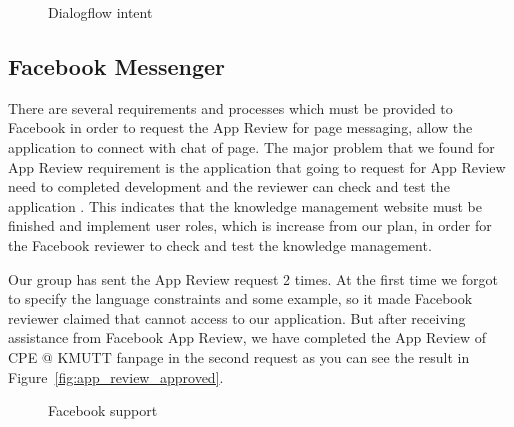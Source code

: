 \documentclass[12pt,oneside,openright,a4paper]{cpe-english-project}
\begin{document}
\begin{figure}[!h]\centering
	\caption{Dialogflow intent}\label{fig:Dialogflow intent}
\end{figure}

\pagebreak
\subsection{Facebook Messenger}
	There are several requirements and processes which must be
	provided to Facebook in order to request the App Review for page messaging,
	allow the application to connect with chat of page.
	The major problem that we found for App Review requirement is
	the application that going to request for App Review need to completed development and 
	the reviewer can check and test the application \cite{before_you_submit}.
	This indicates that the knowledge management website must be finished and
	implement user roles, which is increase from our plan,
	in order for the Facebook reviewer to check and test the knowledge management.

	Our group has sent the App Review request 2 times. At the first time we forgot to specify the
	language constraints and some example, so it made Facebook reviewer claimed that
	cannot access to our application. But after receiving assistance from Facebook App Review,
	we have completed the App Review of CPE @ KMUTT fanpage in the second request
	as you can see the result in Figure~\ref*{fig:app_review_approved}.

	\begin{figure}[!h]\centering
		\caption{Facebook support}\label{fig:Facebook support}
	\end{figure}
\end{document}
